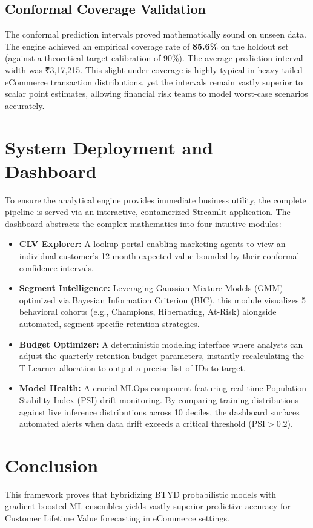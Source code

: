 \documentclass[10pt,conference]{IEEEtran}
\begin{document}
\subsection{Conformal Coverage Validation}
The conformal prediction intervals proved mathematically sound on unseen data. The engine achieved an empirical coverage rate of \textbf{85.6\%} on the holdout set (against a theoretical target calibration of 90\%). The average prediction interval width was ₹3,17,215. This slight under-coverage is highly typical in heavy-tailed eCommerce transaction distributions, yet the intervals remain vastly superior to scalar point estimates, allowing financial risk teams to model worst-case scenarios accurately.

\section{System Deployment and Dashboard}
To ensure the analytical engine provides immediate business utility, the complete pipeline is served via an interactive, containerized Streamlit application. The dashboard abstracts the complex mathematics into four intuitive modules:
\begin{itemize}
    \item \textbf{CLV Explorer:} A lookup portal enabling marketing agents to view an individual customer's 12-month expected value bounded by their conformal confidence intervals.
    \item \textbf{Segment Intelligence:} Leveraging Gaussian Mixture Models (GMM) optimized via Bayesian Information Criterion (BIC), this module visualizes 5 behavioral cohorts (e.g., Champions, Hibernating, At-Risk) alongside automated, segment-specific retention strategies.
    \item \textbf{Budget Optimizer:} A deterministic modeling interface where analysts can adjust the quarterly retention budget parameters, instantly recalculating the T-Learner allocation to output a precise list of IDs to target.
    \item \textbf{Model Health:} A crucial MLOps component featuring real-time Population Stability Index (PSI) drift monitoring. By comparing training distributions against live inference distributions across 10 deciles, the dashboard surfaces automated alerts when data drift exceeds a critical threshold ($\text{PSI} > 0.2$).
\end{itemize}

\section{Conclusion}
This framework proves that hybridizing BTYD probabilistic models with gradient-boosted ML ensembles yields vastly superior predictive accuracy for Customer Lifetime Value forecasting in eCommerce settings. 
\end{document}
